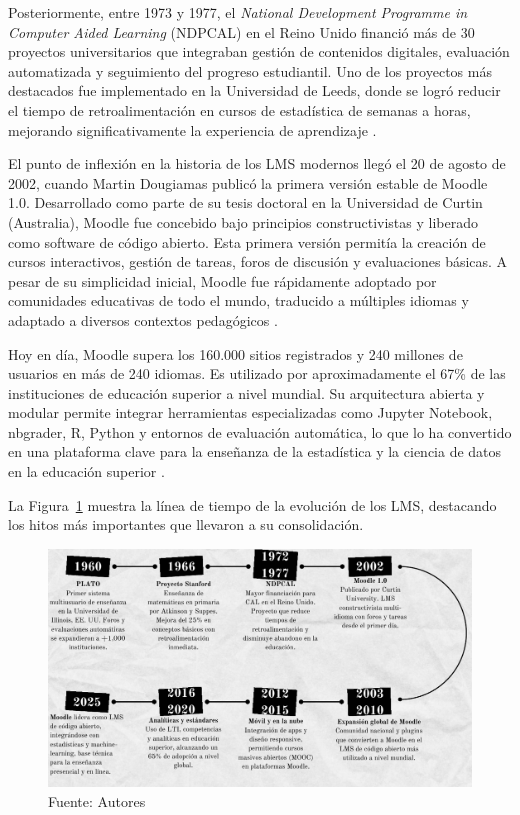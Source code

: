 \documentclass[letter,oneside,12pt,spanish]{report}
\begin{document}
Posteriormente, entre 1973 y 1977, el \textit{National Development Programme in Computer Aided Learning} (NDPCAL) en el Reino Unido financió más de 30 proyectos universitarios que integraban gestión de contenidos digitales, evaluación automatizada y seguimiento del progreso estudiantil. Uno de los proyectos más destacados fue implementado en la Universidad de Leeds, donde se logró reducir el tiempo de retroalimentación en cursos de estadística de semanas a horas, mejorando significativamente la experiencia de aprendizaje \parencite{Hooper1977}.

El punto de inflexión en la historia de los LMS modernos llegó el 20 de agosto de 2002, cuando Martin Dougiamas publicó la primera versión estable de Moodle 1.0. Desarrollado como parte de su tesis doctoral en la Universidad de Curtin (Australia), Moodle fue concebido bajo principios constructivistas y liberado como software de código abierto. Esta primera versión permitía la creación de cursos interactivos, gestión de tareas, foros de discusión y evaluaciones básicas. A pesar de su simplicidad inicial, Moodle fue rápidamente adoptado por comunidades educativas de todo el mundo, traducido a múltiples idiomas y adaptado a diversos contextos pedagógicos \parencite{Moodle2024}.

Hoy en día, Moodle supera los 160.000 sitios registrados y 240 millones de usuarios en más de 240 idiomas. Es utilizado por aproximadamente el 67\% de las instituciones de educación superior a nivel mundial. Su arquitectura abierta y modular permite integrar herramientas especializadas como Jupyter Notebook, nbgrader, R, Python y entornos de evaluación automática, lo que lo ha convertido en una plataforma clave para la enseñanza de la estadística y la ciencia de datos en la educación superior \parencite{Goh2025, Moodle2024}.

La Figura~\ref{fig:LineaTiempo} muestra la línea de tiempo de la evolución de los LMS, destacando los hitos más importantes que llevaron a su consolidación.

\begin{figure}[ht]
	\centering
	\includegraphics[width=1\textwidth]{Figs/Linea del Tiempo.pdf}
	\label{fig:LineaTiempo}
	\\Fuente: Autores
\end{figure}
\end{document}
